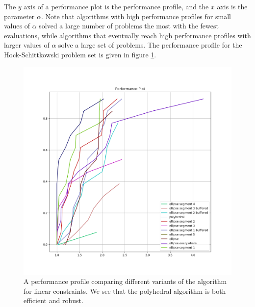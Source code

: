 \documentclass{article}
\begin{document}
The $y$ axis of a performance plot is the performance profile, and the $x$ axis is the parameter $\alpha$.
Note that algorithms with high performance profiles for small values of $\alpha$ solved a large number of problems the most with the fewest evaluations, while algorithms that eventually reach high performance profiles with larger values of $\alpha$ solve a large set of problems.
The performance profile for the Hock-Schittkowski problem set is given in figure \cref{performance_profile_image}.

	
\begin{figure}[ht]
    \centering
    \includegraphics[scale=0.4]{images/performance_profile_plot.png}
    \caption[A performance profile comparing variants of the algorithm for linear constraints.]{
    	A performance profile comparing different variants of the algorithm for linear constraints.
    	We see that the polyhedral algorithm is both efficient and robust.
    }
    \label{performance_profile_image}
\end{figure}



\end{document}
